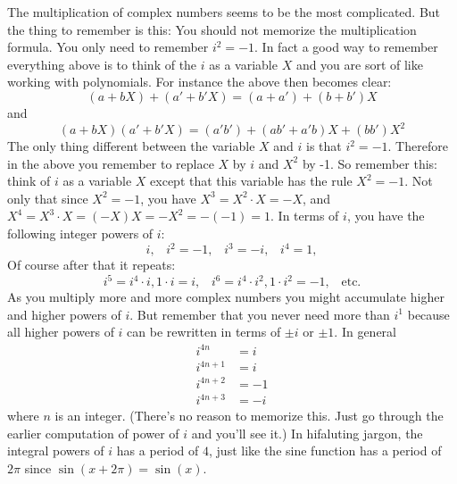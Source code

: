 The multiplication of complex numbers seems to be the most complicated.
But the thing to remember is this:
You should not memorize the multiplication formula.
You only need to remember $i^2 = -1$.
In fact a good way to remember everything above is to think of the
$i$ as a variable $X$ and you are sort of like working with
polynomials.
For instance the above then becomes clear:
\[
(a + bX) + (a' + b'X) = (a+a') + (b + b')X
\]
and
\[
(a + bX) (a' + b'X) = (a'b') + (ab' + a'b)X + (bb')X^2
\]
The only thing different between the variable $X$ and $i$ is
that $i^2 = -1$.
Therefore in the above you remember to replace $X$ by $i$ and
$X^2$ by -1.
So remember this: think of $i$ as a variable $X$ except that this
variable has the rule $X^2 = -1$.
Not only that since $X^2 = -1$, you have $X^3 = X^2 \cdot X = -X$,
and $X^4 = X^3 \cdot X = (-X)X = -X^2 = -(-1) = 1$.
In terms of $i$, you have the following integer powers of $i$:
\[
i, \,\,\,\,\,
i^2 = -1, \,\,\,\,\,
i^3 = -i, \,\,\,\,\,
i^4 = 1, 
\]
Of course after that it repeats:
\[
i^5 = i^4 \cdot i, 1 \cdot i = i, \,\,\,\,\,
i^6 = i^4 \cdot i^2, 1 \cdot i^2 = -1, \,\,\,\,\,
\text{etc.}
\]
As you multiply more and more complex numbers you might accumulate
higher and higher powers of $i$.
But remember that you never need more than $i^1$
because all higher powers of $i$ can be rewritten in terms of $\pm i$ or 
$\pm 1$.
In general
\begin{align*}
i^{4n} &= i \\
i^{4n+1} &= i \\
i^{4n+2} &= -1 \\
i^{4n+3} &= -i
\end{align*}
where $n$ is an integer.
(There's no reason to memorize this. 
Just go through the earlier computation of power of $i$ and you'll see it.)
In hifaluting jargon, the integral powers of $i$ has a period of $4$,
just like the sine function has a period of $2\pi$ since
$\sin(x + 2\pi) = \sin(x)$.

